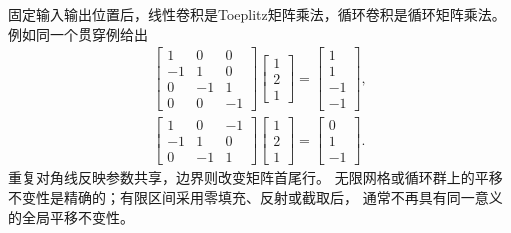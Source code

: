 固定输入输出位置后，线性卷积是Toeplitz矩阵乘法，循环卷积是循环矩阵乘法。
例如同一个贯穿例给出
\begin{gather*}
  \begin{bmatrix}
    1&0&0\\-1&1&0\\0&-1&1\\0&0&-1
  \end{bmatrix}
  \begin{bmatrix}1\\2\\1\end{bmatrix}
  =\begin{bmatrix}1\\1\\-1\\-1\end{bmatrix},\\
  \begin{bmatrix}1&0&-1\\-1&1&0\\0&-1&1\end{bmatrix}
  \begin{bmatrix}1\\2\\1\end{bmatrix}
  =\begin{bmatrix}0\\1\\-1\end{bmatrix}.
\end{gather*}
重复对角线反映参数共享，边界则改变矩阵首尾行。
无限网格或循环群上的平移不变性是精确的；有限区间采用零填充、反射或截取后，
通常不再具有同一意义的全局平移不变性。

